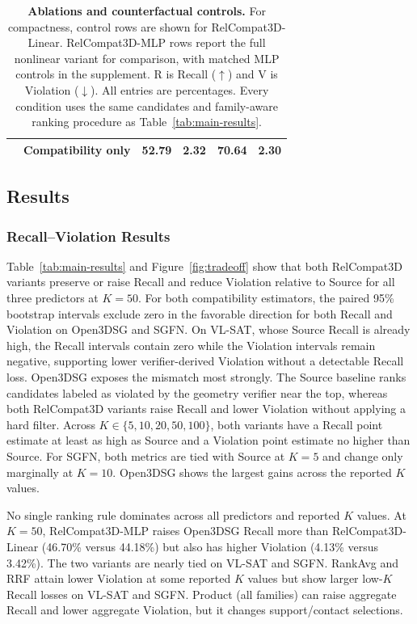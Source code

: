 \begin{table}[t]
{\begin{tabular}{@{}llrrrr@{}}
    & Compatibility only & 52.79 & 2.32 & 70.64 & 2.30 \\
    \bottomrule
    \end{tabular}
    }
    \caption{\textbf{Ablations and counterfactual controls.} For compactness, control rows are shown for RelCompat3D-Linear. RelCompat3D-MLP rows report the full nonlinear variant for comparison, with matched MLP controls in the supplement. R is Recall ($\uparrow$) and V is Violation ($\downarrow$). All entries are percentages. Every condition uses the same candidates and family-aware ranking procedure as Table~\ref{tab:main-results}.}
    \label{tab:ablations}
\end{table}
    
\subsection{Results}
\subsubsection{Recall–Violation Results}
    Table~\ref{tab:main-results} and Figure~\ref{fig:tradeoff} show that both RelCompat3D variants preserve or raise Recall and reduce Violation relative to Source for all three predictors at $K=50$. For both compatibility estimators, the paired 95\% bootstrap intervals exclude zero in the favorable direction for both Recall and Violation on Open3DSG and SGFN. On VL-SAT, whose Source Recall is already high, the Recall intervals contain zero while the Violation intervals remain negative, supporting lower verifier-derived Violation without a detectable Recall loss. Open3DSG exposes the mismatch most strongly. The Source baseline ranks candidates labeled as violated by the geometry verifier near the top, whereas both RelCompat3D variants raise Recall and lower Violation without applying a hard filter. Across $K\in\{5,10,20,50,100\}$, both variants have a Recall point estimate at least as high as Source and a Violation point estimate no higher than Source. For SGFN, both metrics are tied with Source at $K=5$ and change only marginally at $K=10$. Open3DSG shows the largest gains across the reported $K$ values. 
    
    No single ranking rule dominates across all predictors and reported $K$ values. At $K=50$, RelCompat3D-MLP raises Open3DSG Recall more than RelCompat3D-Linear (46.70\% versus 44.18\%) but also has higher Violation (4.13\% versus 3.42\%). The two variants are nearly tied on VL-SAT and SGFN. RankAvg and RRF attain lower Violation at some reported $K$ values but show larger low-$K$ Recall losses on VL-SAT and SGFN. Product (all families) can raise aggregate Recall and lower aggregate Violation, but it changes support/contact selections. 

